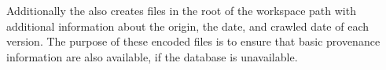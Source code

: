 Additionally the \modelcrawler also creates files in the root of the workspace path with additional information about the origin, the date, and crawled date of each version.
The purpose of these \json encoded files is to ensure that basic provenance information are also available, if the \masymos database is unavailable.

